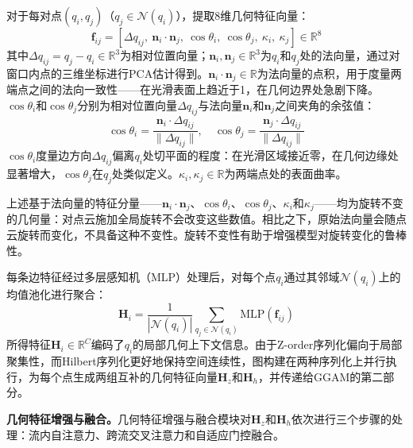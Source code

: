 \documentclass[12pt,a4paper,openany,oneside]{ctexbook}
\theoremstyle{definition}
\theoremstyle{remark}
\begin{document}
对于每对点$(q_i, q_j)$（$q_j \in \mathcal{N}(q_i)$），提取8维几何特征向量：
\begin{equation}
	\mathbf{f}_{ij} = [\Delta q_{ij},\ \mathbf{n}_i \cdot \mathbf{n}_j,\ \cos\theta_i,\ \cos\theta_j,\ \kappa_i,\ \kappa_j] \in \mathbb{R}^8
\end{equation}
其中$\Delta q_{ij} = q_j - q_i \in \mathbb{R}^3$为相对位置向量；$\mathbf{n}_i, \mathbf{n}_j \in \mathbb{R}^3$为$q_i$和$q_j$处的法向量，通过对窗口内点的三维坐标进行PCA估计得到。$\mathbf{n}_i \cdot \mathbf{n}_j \in \mathbb{R}$为法向量的点积，用于度量两端点之间的法向一致性——在光滑表面上趋近于1，在几何边界处急剧下降。$\cos\theta_i$和$\cos\theta_j$分别为相对位置向量$\Delta q_{ij}$与法向量$\mathbf{n}_i$和$\mathbf{n}_j$之间夹角的余弦值：
\begin{equation}
	\cos\theta_i = \frac{\mathbf{n}_i \cdot \Delta q_{ij}}{\|\Delta q_{ij}\|}, \quad \cos\theta_j = \frac{\mathbf{n}_j \cdot \Delta q_{ij}}{\|\Delta q_{ij}\|}
\end{equation}
$\cos\theta_i$度量边方向$\Delta q_{ij}$偏离$q_i$处切平面的程度：在光滑区域接近零，在几何边缘处显著增大，$\cos\theta_j$在$q_j$处类似定义。$\kappa_i, \kappa_j \in \mathbb{R}$为两端点处的表面曲率。

上述基于法向量的特征分量——$\mathbf{n}_i \cdot \mathbf{n}_j$、$\cos\theta_i$、$\cos\theta_j$、$\kappa_i$和$\kappa_j$——均为旋转不变的几何量\cite{clusterNet, riconv}：对点云施加全局旋转不会改变这些数值。相比之下，原始法向量会随点云旋转而变化，不具备这种不变性。旋转不变性有助于增强模型对旋转变化的鲁棒性\cite{clusterNet, riconv}。

每条边特征经过多层感知机（MLP）处理后，对每个点$q_i$通过其邻域$\mathcal{N}(q_i)$上的均值池化进行聚合：
\begin{equation}
	\mathbf{H}_i = \frac{1}{|\mathcal{N}(q_i)|} \sum_{q_j \in \mathcal{N}(q_i)} \text{MLP}(\mathbf{f}_{ij})
\end{equation}
所得特征$\mathbf{H}_i \in \mathbb{R}^C$编码了$q_i$的局部几何上下文信息。由于Z-order序列化偏向于局部聚集性，而Hilbert序列化更好地保持空间连续性，图构建在两种序列化上并行执行，为每个点生成两组互补的几何特征向量$\mathbf{H}_z$和$\mathbf{H}_h$，并传递给GGAM的第二部分。

\textbf{几何特征增强与融合。}几何特征增强与融合模块对$\mathbf{H}_z$和$\mathbf{H}_h$依次进行三个步骤的处理：流内自注意力、跨流交叉注意力和自适应门控融合。
\end{document}
